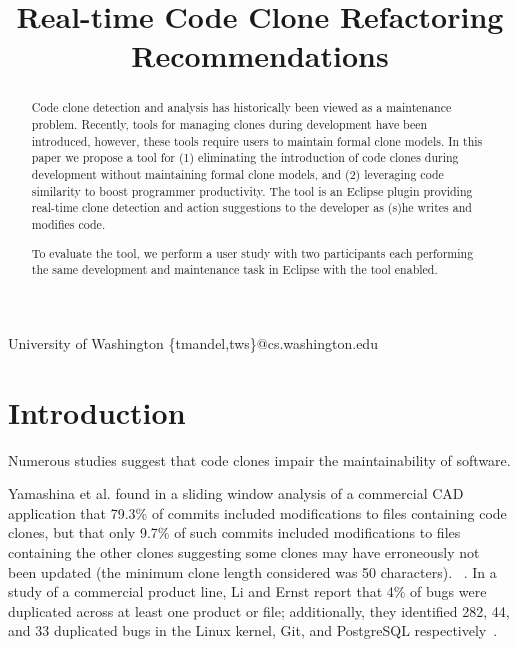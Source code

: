 \documentclass[nocopyrightspace,10pt]{sigplanconf}
\begin{document}
%

\title{Real-time Code Clone Refactoring Recommendations}
           {University of Washington}
           {\{tmandel,tws\}@cs.washington.edu}

\maketitle
\begin{abstract}
Code clone detection and analysis has historically been viewed as a
maintenance problem. Recently, tools for managing clones during
development have been introduced, however, these tools require
users to maintain formal clone models.
In this paper we propose a tool for (1) eliminating the
introduction of code clones during development without maintaining formal clone models, and (2) leveraging code
similarity to boost programmer productivity.
The tool
is an Eclipse plugin providing real-time clone detection and action
suggestions to the developer as (s)he writes and modifies
code. 

To evaluate the tool, we perform a user study with two participants
each performing the same development and maintenance task in Eclipse
with the tool enabled.
\end{abstract}



\section{Introduction}
\label{sec:intro}
Numerous studies suggest that code clones impair the maintainability
of software.

Yamashina et al. found in a sliding window analysis of a commercial CAD
application that 79.3\% of commits included modifications to files
containing code clones, but that only 9.7\% of such commits included
modifications to files containing the other
clones suggesting some clones may have erroneously not been updated
(the minimum clone length considered was 50 characters).
~\cite{Yamashina2008}. 
In a study of a commercial product line, Li and Ernst report that 4\%
of bugs were duplicated across at least one product or file;
additionally, they identified 282, 44, and 33 duplicated bugs in the
Linux kernel, Git, and PostgreSQL respectively~\cite{LiE2011}.
\end{document}
